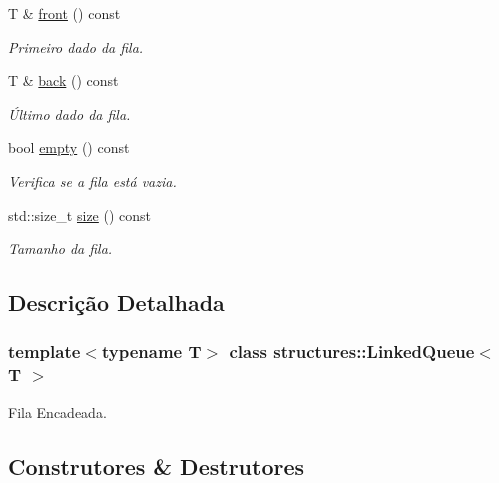 \begin{DoxyCompactItemize}
T \& \hyperlink{classstructures_1_1LinkedQueue_a904219098f1f6b3aa229a8ea0f929b64}{front} () const
\begin{DoxyCompactList}\small\item\em Primeiro dado da fila. \end{DoxyCompactList}\item 
T \& \hyperlink{classstructures_1_1LinkedQueue_ac69ee50f58e8501f7eaddec5b474a87c}{back} () const
\begin{DoxyCompactList}\small\item\em Último dado da fila. \end{DoxyCompactList}\item 
bool \hyperlink{classstructures_1_1LinkedQueue_a24995d6b61ce9e8d05718c966b699c5a}{empty} () const
\begin{DoxyCompactList}\small\item\em Verifica se a fila está vazia. \end{DoxyCompactList}\item 
std\+::size\+\_\+t \hyperlink{classstructures_1_1LinkedQueue_ab86b0d95b796c277a21b89f106efd173}{size} () const
\begin{DoxyCompactList}\small\item\em Tamanho da fila. \end{DoxyCompactList}\end{DoxyCompactItemize}


\subsection{Descrição Detalhada}
\subsubsection*{template$<$typename T$>$\newline
class structures\+::\+Linked\+Queue$<$ T $>$}

Fila Encadeada. 

\subsection{Construtores \& Destrutores}
\mbox{\label{classstructures_1_1LinkedQueue_aae2a207f04610f5bb460de8b4f5c7650}} 
